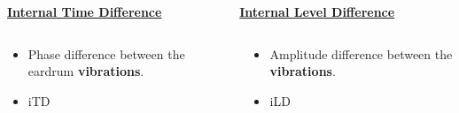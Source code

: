 \documentclass{beamer}
\begin{document}
\begin{frame}[t]
\begin{exampleblock}{}
{\begin{columns}
    \begin{column}{0.5\textwidth}
    \centering
    \underline{\textbf{Internal Time Difference}}

    \end{column}
     
    \begin{column}{0.5\textwidth}
    \centering
    \underline{\textbf{Internal Level Difference}}
    \end{column}
    
  \end{columns}
  
    \begin{columns}
 
    \begin{column}{0.5\textwidth}
    \small
     \begin{itemize}
    \item[] Phase difference between the eardrum \textbf{vibrations}.
    \item iTD
     \end{itemize}
    \end{column}
     
    \begin{column}{0.5\textwidth}
    \small
     \begin{itemize}
          \item[] Amplitude difference between the \textbf{vibrations}.
          \item iLD
     \end{itemize}
    \end{column}
    
  \end{columns}}
  \end{exampleblock}
\end{frame}

%  
% 
%      
%     
  
\end{document}
